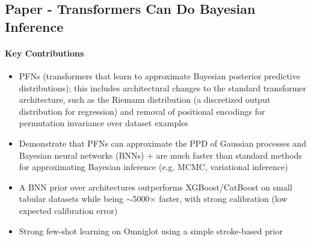 \documentclass[12pt,a4paper,twoside]{article}
\begin{document}
\subsection{Paper - Transformers Can Do Bayesian Inference}
\begin{paper}[
		papertitle = {Transformers Can Do Bayesian Inference~\cite{Mller2022}},
		authors = {Mueller et al.},
		summary = {
				Bayesian methods are usually slow or mathematically intractable for large datasets. Deep learning is fast but often bad at uncertainty and priors. As a solution, the authors present Prior-Data Fitted Networks (PFNs), which learn the mapping of the data to Bayesian posterior prediction.}
	]
	\paragraph{Key Contributions}
	\begin{itemize}
		\item PFNs (transformers that learn to approximate Bayesian posterior predictive distributions); this includes architectural changes to the standard transformer architecture, such as the Riemann distribution (a discretized output distribution for regression) and removal of positional encodings for permutation invariance over dataset examples
		\item Demonstrate that PFNs can approximate the PPD of Gaussian processes and Bayesian neural networks (BNNs) + are much faster than standard methods for approximating Bayesian inference (e.g. MCMC, variational inference)
		\item A BNN prior over architectures outperforms XGBoost/CatBoost on small tabular datasets while being $\sim$5000$\times$ faster, with strong calibration (low expected calibration error)
		\item Strong few-shot learning on Omniglot using a simple stroke-based prior
	\end{itemize}
	\tcblower

\end{paper}
\end{document}
